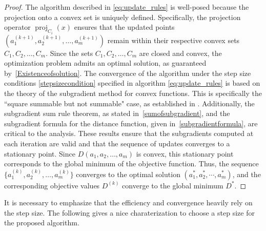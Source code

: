 \documentclass[12pt]{article}
\theoremstyle{plain}
\theoremstyle{definition}
\begin{document}
\begin{proof}
	The algorithm described in \eqref{eq:update_rules} is well-posed because the projection onto a convex set is uniquely defined. Specifically, the projection operator \( \operatorname{proj}_{C_i}(x) \) ensures that the updated points \( (a_1^{(k+1)}, a_2^{(k+1)}, \dots,a_m^{(k+1)}) \) remain within their respective convex sets \( C_1, C_2, \dots,C_m \). 
	Since the sets \( C_1, C_2, \dots,C_m \) are closed and convex, the optimization problem admits an optimal solution, as guaranteed by~\ref{Existenceofsolution}. The convergence of the algorithm under the step size conditions \eqref{stepsizecondition} specified in algorithm  \eqref{eq:update_rules} is based on the theory of the subgradient method for convex functions. This is specifically the ``square summable but not summable" case, as established in \cite[Page 480, Proposition 8.2.6]{BeNeOz03}.
	Additionally, the subgradient sum rule theorem, as stated in~\ref{sumofsubgradient}, and the subgradient formula for the distance function, given in~\ref{subgradientformula}, are critical to the analysis. These results ensure that the subgradients computed at each iteration are valid and that the sequence of updates converges to a stationary point. Since \( D(a_1, a_2, \dots,a_m) \) is convex, this stationary point corresponds to the global minimum of the objective function.
	Thus, the sequence \(\{a_1^{(k)}\allowbreak, a_2^{(k)}\allowbreak, \dots\allowbreak, a_m^{(k)}\}\) converges to the optimal solution \((a_1^*\allowbreak, a_2^*\allowbreak, \cdots\allowbreak, a_m^*)\), and the corresponding objective values \(D^{(k)}\) converge to the global minimum \(D^*\).	
\end{proof}

It is necessary to emphasize that the efficiency and convergence heavily rely on the step size. The following gives a nice charaterization to choose a step size for the proposed algorithm. 
\end{document}

